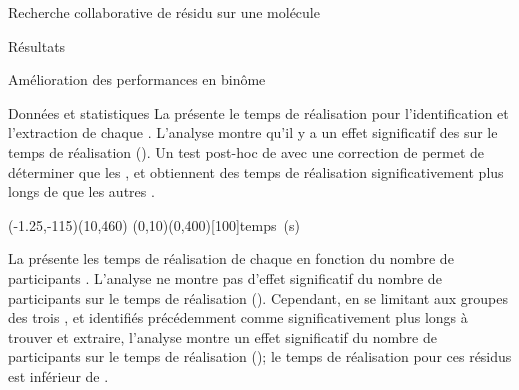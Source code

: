 \documentclass[myfrancais,ngerman,english,french]{mythesis}
\begin{document}
\begin{mychapter}{Recherche collaborative de résidu sur une molécule}
\begin{mysection}{Résultats}
\begin{mysubsection}{Amélioration des performances en binôme}
\begin{mysubsubsection}{Données et statistiques}
					La  présente le temps de réalisation  pour l'identification et l'extraction de chaque  .
					L'analyse montre qu'il y a un effet significatif des   sur le temps de réalisation  ().
					Un test post-hoc de  avec une correction de  permet de déterminer que les  ,  et  obtiennent des temps de réalisation significativement plus longs de  que les autres .

					\begin{myfigure}
						\begin{myps}(-1.25,-115)(10,460)
							\myaxes(0,10){}(0,400)[100]{temps~(s)}
						\end{myps}
					\end{myfigure}

					La  présente les temps de réalisation  de chaque   en fonction du nombre de participants .
					L'analyse ne montre pas d'effet significatif du nombre de participants  sur le temps de réalisation  ().
					Cependant, en se limitant aux groupes des trois  ,  et  identifiés précédemment comme significativement plus longs à trouver et extraire, l'analyse montre un effet significatif du nombre de participants  sur le temps de réalisation  (); le temps de réalisation pour ces résidus est inférieur de .


\end{mysubsubsection}
\end{mysubsection}
\end{mysection}
\end{mychapter}
\end{document}
